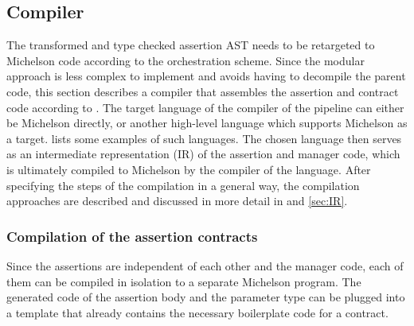 \subsection{Compiler}
The transformed and type checked assertion AST needs to be retargeted to Michelson code according to the orchestration scheme. Since the modular approach is less complex to implement and avoids having to decompile the parent code, this section describes a compiler that assembles the assertion and contract code according to . The target language of the compiler of the pipeline can either be Michelson directly, or another high-level language which supports Michelson as a target.  lists some examples of such languages. The chosen language then serves as an intermediate representation (IR) of the assertion and manager code, which is ultimately compiled to Michelson by the compiler of the language. After specifying the steps of the compilation in a general way, the compilation approaches are described and discussed in more detail in  and \ref{sec:IR}.

\subsubsection{Compilation of the assertion contracts}
Since the assertions are independent of each other and the manager code, each of them can be compiled in isolation to a separate Michelson program. The generated code of the assertion body and the parameter type can be plugged into a template that already contains the necessary boilerplate code for a contract.

